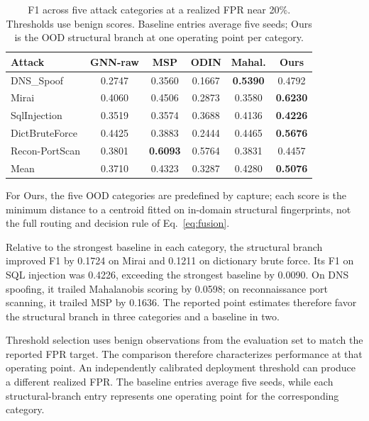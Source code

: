 \documentclass{article}
\begin{document}
\begin{table}[h]
	\centering
	\caption{F1 across five attack categories at a realized FPR near 20\%. Thresholds
		use benign scores. Baseline entries average five seeds; Ours is the OOD structural
		branch at one operating point per category.}
	\label{tab:comparison}
	\footnotesize
	\setlength{\tabcolsep}{3.2pt}
	\begin{tabular}{@{}lccccc@{}}
		\hline
		Attack & GNN-raw & MSP & ODIN & Mahal. & Ours \\
		\hline
		DNS\_Spoof          & 0.2747 & 0.3560 & 0.1667 & \textbf{0.5390} & 0.4792 \\
		Mirai               & 0.4060 & 0.4506 & 0.2873 & 0.3580 & \textbf{0.6230} \\
		SqlInjection        & 0.3519 & 0.3574 & 0.3688 & 0.4136 & \textbf{0.4226} \\
		DictBruteForce      & 0.4425 & 0.3883 & 0.2444 & 0.4465 & \textbf{0.5676} \\
		Recon-PortScan      & 0.3801 & \textbf{0.6093} & 0.5764 & 0.3831 & 0.4457 \\
		\hline
		Mean                & 0.3710 & 0.4323 & 0.3287 & 0.4280 & \textbf{0.5076} \\
		\hline
	\end{tabular}
\end{table}

For Ours, the five OOD categories are predefined by capture; each score is the
minimum distance to a centroid fitted on in-domain structural fingerprints, not
the full routing and decision rule of Eq.~\ref{eq:fusion}.

Relative to the strongest baseline in each category, the structural branch improved F1 by
0.1724 on Mirai and 0.1211 on dictionary brute force. Its F1 on SQL injection was
0.4226, exceeding the strongest baseline by 0.0090. On DNS spoofing, it trailed
Mahalanobis scoring by 0.0598; on reconnaissance port scanning, it trailed MSP by
0.1636. The reported point estimates therefore favor the structural branch in three
categories and a baseline in two. 

Threshold selection uses benign observations from the evaluation set to match the
reported FPR target. The comparison therefore characterizes performance at that
operating point. An independently calibrated deployment threshold can produce a
different realized FPR. The baseline entries average five seeds, while each
structural-branch entry represents one operating point for the corresponding category.
\end{document}
